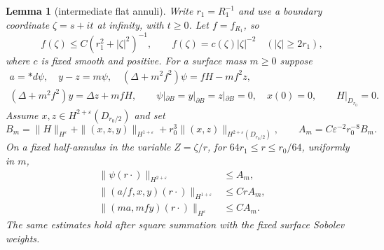 \documentclass[11pt]{amsart}
\newtheorem{lemma}[theorem]{Lemma}
\theoremstyle{definition}
\theoremstyle{remark}
\theoremstyle{plain}
\begin{document}
\begin{lemma}[intermediate flat annuli]\label{lem:gluing-flat-annuli}
Write $r_1=R_1^{-1}$ and use a boundary coordinate $\zeta=s+it$
at infinity, with $t\geq0$. Let $f=f_{R_1}$, so
\[
 f(\zeta)\leq C(r_1^2+|\zeta|^2)^{-1},\qquad
 f(\zeta)=c(\zeta)|\zeta|^{-2}\quad (|\zeta|\geq2r_1),
\]
where $c$ is fixed smooth and positive. For a surface mass $m\geq0$
suppose
\begin{equation}\label{eq:gluing-flat-stream-data}
 \begin{gathered}
 a=*d\psi,\quad y-z=m\psi,\quad
 (\Delta+m^2f^2)\psi=fH-mf^2z,\\
 (\Delta+m^2f^2)y=\Delta z+mfH,\qquad
 \psi|_{\partial B}=y|_{\partial B}=z|_{\partial B}=0,\quad x(0)=0,
 \qquad H|_{D_{r_0}}=0.
 \end{gathered}
\end{equation}
Assume $x,z\in H^{2+\varepsilon}(D_{r_0/2})$ and set
\[
 B_m=\|H\|_{H^\varepsilon}+\|(x,z,y)\|_{H^{1+\varepsilon}}
                   +r_0^3\|(x,z)\|_{H^{2+\varepsilon}(D_{r_0/2})},
 \qquad A_m=C\varepsilon^{-2}r_0^{-8}B_m.
\]
On a fixed half-annulus in the variable $Z=\zeta/r$, for
$64r_1\leq r\leq r_0/64$, uniformly in $m$,
\begin{equation}\label{eq:gluing-flat-annular-estimate}
 \begin{split}
 \|\psi(r\cdot)\|_{H^{2+\varepsilon}}&\leq A_m,\\
 \|(a/f,x,y)(r\cdot)\|_{H^{1+\varepsilon}}&\leq CrA_m,\\
 \|(ma,mfy)(r\cdot)\|_{H^\varepsilon}&\leq CA_m.
 \end{split}
\end{equation}
The same estimates hold after square summation with the fixed
surface Sobolev weights.
\end{lemma}
\end{document}
